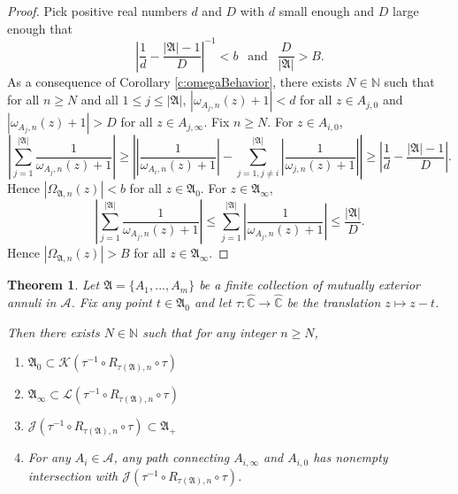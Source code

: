 \documentclass[a4paper,11pt,onecolumn]{amsart}
\newtheorem{theorem}{Theorem}[section]
\theoremstyle{definition}
\begin{document}
  \begin{proof}
  Pick positive real numbers $d$ and $D$ with $d$ small enough and $D$ large enough that $$\left|\frac{1}{d} - \frac{|\mathfrak{A}|-1}{D}\right|^{-1} < b \ \  \textrm{ and } \ \  \frac{D}{|\mathfrak{A}|} > B.$$
  As a consequence of Corollary \ref{c:omegaBehavior}, there exists $N \in \mathbb{N}$ such that for all $n \geq N$ and all $1 \leq j \leq |\mathfrak{A}|$, $|\omega_{A_j,n} (z)+ 1| < d$ for all $z \in A_{j,0}$ and $|\omega_{A_j,n} (z)+ 1| > D$ for all $z \in A_{j,\infty}$. 
  Fix $n \geq N$.  For $z \in A_{i,0}$,
$$\left| \sum_{j=1}^{|\mathfrak{A}|} \frac{1}{\omega_{A_j,n}(z)+1}  \right|  \geq 
\left| \left| \frac{1}{\omega_{A_i,n}(z)+1} \right| - \sum_{j=1,j \not = i}^{|\mathfrak{A}|} \left| \frac{1}{\omega_{j,n}(z)+1} \right| \right| \geq \left| \frac{1}{d}-\frac{|\mathfrak{A}|-1}{D} \right|. $$
Hence $|\Omega_{\mathfrak{A},n}(z)| < b$ for all $z \in \mathfrak{A}_0$.   For $z \in \mathfrak{A}_{\infty}$,
 $$\left| \sum_{j=1}^{|\mathfrak{A}|} \frac{1}{\omega_{A_j,n}(z)+1}  \right| \leq \sum_{j=1}^{|\mathfrak{A}|} \left |\frac{1}{\omega_{A_j,n}(z)+1} \right| \leq \frac{|\mathfrak{A}|}{D}.$$ Hence $|\Omega_{\mathfrak{A},n}(z)| > B$ for all $z \in \mathfrak{A}_{\infty}$. 
  \end{proof}
  
  \begin{theorem} \label{t:RationalVersion}
  Let $\mathfrak{A}=\{A_1,...,A_m\}$ be a finite collection of mutually exterior annuli in $\mathcal{A}$.  Fix any point $t \in \mathfrak{A}_0$ and let $\tau:\hat{\mathbb{C}} \rightarrow \hat{\mathbb{C}}$ be the translation $z \mapsto z-t$.  
  
  
   Then there exists $N \in \mathbb{N}$ such that for any integer $n \geq N$, 
  \begin{enumerate}
  \item $\mathfrak{A}_0 \subset \mathcal{K}(\tau^{-1} \circ R_{\tau(\mathfrak{A}),n} \circ \tau)$
  \item $\mathfrak{A}_{\infty} \subset \mathcal{L}(\tau^{-1} \circ R_{\tau(\mathfrak{A}),n} \circ \tau)$
  \item $ \mathcal{J}(\tau^{-1} \circ R_{\tau(\mathfrak{A}),n} \circ \tau) \subset \mathfrak{A}_+$
  \item For any $A_i \in \mathcal{A}$, any path connecting $A_{i,\infty}$ and $A_{i,0}$ has nonempty intersection with $\mathcal{J}(\tau^{-1} \circ R_{\tau(\mathfrak{A}),n} \circ \tau)$.
  \end{enumerate}
  \end{theorem}
  
\end{document}
